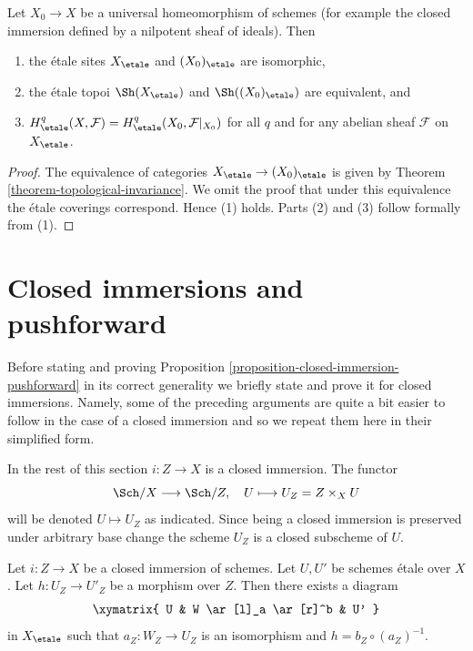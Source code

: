 \begin{proposition}
\label{proposition-topological-invariance}
Let $X_0 \to X$ be a universal homeomorphism of schemes
(for example the closed immersion defined by a nilpotent sheaf of ideals).
Then
\begin{enumerate}
\item the \'etale sites $X_\etale$ and $(X_0)_\etale$ are isomorphic,
\item the \'etale topoi $\Sh(X_\etale)$ and $\Sh((X_0)_\etale)$
are equivalent, and
\item $H^q_\etale(X, \mathcal{F}) = H^q_\etale(X_0, \mathcal{F}|_{X_0})$
for all $q$ and
for any abelian sheaf $\mathcal{F}$ on $X_\etale$.
\end{enumerate}
\end{proposition}

\begin{proof}
The equivalence of categories $X_\etale \to (X_0)_\etale$ is
given by Theorem \ref{theorem-topological-invariance}. We omit
the proof that under this equivalence the \'etale coverings correspond.
Hence (1) holds. Parts (2) and (3) follow formally from (1).
\end{proof}






\section{Closed immersions and pushforward}
\label{section-closed-immersions}

\noindent
Before stating and proving
Proposition \ref{proposition-closed-immersion-pushforward}
in its correct generality we briefly state and prove it for
closed immersions. Namely, some of the preceding arguments
are quite a bit easier to follow in the case of a closed immersion and
so we repeat them here in their simplified form.

\medskip\noindent
In the rest of this section $i : Z \to X$ is a closed immersion.
The functor
$$
\Sch/X \longrightarrow \Sch/Z, \quad
U \longmapsto U_Z = Z \times_X U
$$
will be denoted $U \mapsto U_Z$ as indicated. Since being a closed immersion
is preserved under arbitrary base change the scheme $U_Z$ is a closed subscheme
of $U$.

\begin{lemma}
\label{lemma-closed-immersion-almost-full}
Let $i : Z \to X$ be a closed immersion of schemes.
Let $U, U'$ be schemes \'etale over $X$. Let $h : U_Z \to U'_Z$
be a morphism over $Z$. Then there exists a diagram
$$
\xymatrix{
U & W \ar[l]_a \ar[r]^b & U'
}
$$
in $X_\etale$ such that $a_Z : W_Z \to U_Z$
is an isomorphism and $h = b_Z \circ (a_Z)^{-1}$.
\end{lemma}

